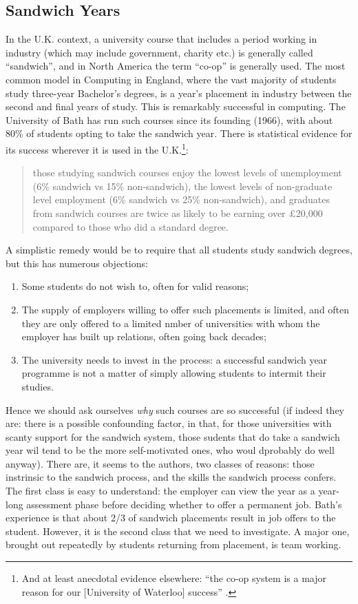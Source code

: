\documentclass[sigconf]{acmart}
\begin{document}
\subsection{Sandwich Years}
In the U.K. context, a university course that includes a period working in industry (which may include government, charity etc.) is generally called ``sandwich'', and in North America the term ``co-op'' is generally used. The most common model in Computing in England, where the vast majority of students study three-year Bachelor's degrees, is a year's placement in industry between the second and final years of study. This is remarkably successful in computing. The University of Bath has run such courses since its founding (1966), with about 80\% of students opting to take the sandwich year. There is statistical evidence for its success wherever it is used in the U.K.\footnote{And at least anecdotal evidence elsewhere: ``the co-op system is a major reason for our [University of Waterloo] success'' \cite{Watt2017a}.}:
\begin{quote}
those studying sandwich courses enjoy the lowest levels of unemployment (6\% sandwich vs 15\% non-sandwich), the lowest levels of non-graduate level employment (6\% sandwich vs 25\% non-sandwich), and graduates from sandwich courses are twice as likely to be earning over \pounds20,000 compared to those who did a standard degree. \cite[\P2.5]{Shadbolt2016a}
\end{quote}
A simplistic remedy would be to require that all students study sandwich degrees, but this has numerous objections:
\begin{enumerate}
\item Some students do not wish to, often for valid reasons;
\item The supply of employers willing to offer such placements is limited, and often they are only offered to a limited nmber of universities with whom the employer has built up relations, often going back decades;
\item The university needs to invest in the process: a successful sandwich year programme is not a matter of simply allowing students to intermit their studies.
\end{enumerate}
Hence we should ask ourselves \emph{why} such courses are so successful (if indeed they are: there is a possible confounding factor, in that, for those universities with scanty support for the sandwich system, those sudents that do take a sandwich year wil tend to be the more self-motivated ones, who woul dprobably do well anyway).  %
There are, it seems to the authors, two classes of reasons: those instrinsic to the sandwich process, and the skills the sandwich process confers. The first class is easy to understand: the employer can view the year as a year-long assessment phase before deciding whether to offer a permanent job. Bath's experience is that about 2/3 of sandwich placements result in job offers to the student. However, it is the second class that we need to investigate. A major one, brought out repeatedly by students returning from placement, is team working.
\end{document}
